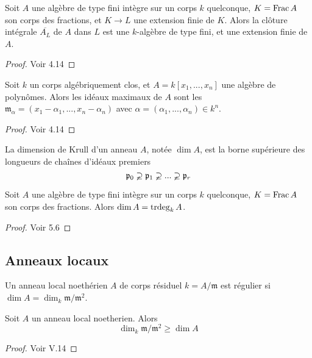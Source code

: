 \begin{thm}\label{IntClosureFinite}
Soit $A$ une algèbre de type fini intègre sur un corps $k$ quelconque, $K=\operatorname{Frac} A$ son corps des fractions, et $K\rightarrow L$ une extension finie de $K$. Alors la clôture intégrale $\overline{A_L}$ de $A$ dans $L$ est une $k$-algèbre de type fini, et une extension finie de $A$.
\end{thm}
\begin{proof}
Voir \cite{Eisenbud} 4.14
\end{proof}

\begin{thm}[Nullstellensatz]\label{Nullstellensatz}
Soit $k$ un corps algébriquement clos, et $A=k[x_1,...,x_n]$ une algèbre de polynômes. Alors les idéaux maximaux de $A$ sont les $\mathfrak{m}_\alpha=(x_1-\alpha_1,...,x_n-\alpha_n)$ avec $\alpha=(\alpha_1,...,\alpha_n)\in k^n$.
\end{thm}
\begin{proof}
Voir \cite{Eisenbud} 4.14
\end{proof}

\begin{defn}
La dimension de Krull d'un anneau $A$, notée $\dim A$, est la borne supérieure des longueurs de chaînes d'idéaux premiers
$$\mathfrak{p}_0\varsupsetneq \mathfrak{p}_1 \varsupsetneq...\varsupsetneq  \mathfrak{p}_r$$
\end{defn}

\begin{thm}\label{FundamentalDimTheory}
Soit $A$ une algèbre de type fini intègre sur un corps $k$ quelconque, $K=\operatorname{Frac} A$ son corps des fractions. Alors $\dim A=\operatorname{trdeg}_k A$.
\end{thm}
\begin{proof}
Voir \cite{Matsumura} 5.6
\end{proof}

\subsection{Anneaux locaux}

\begin{defn}
Un anneau local noethérien $A$ de corps résiduel $k=A/\mathfrak{m}$ est régulier si $\dim A =\dim_k\mathfrak{m}/\mathfrak{m}^2$.
\end{defn}

\begin{prop}
Soit $A$ un anneau local noetherien. Alors $$\dim_k\mathfrak{m}/\mathfrak{m}^2\geq \dim A $$
\end{prop}
\begin{proof}
Voir \cite{Matsumura} V.14
\end{proof}

